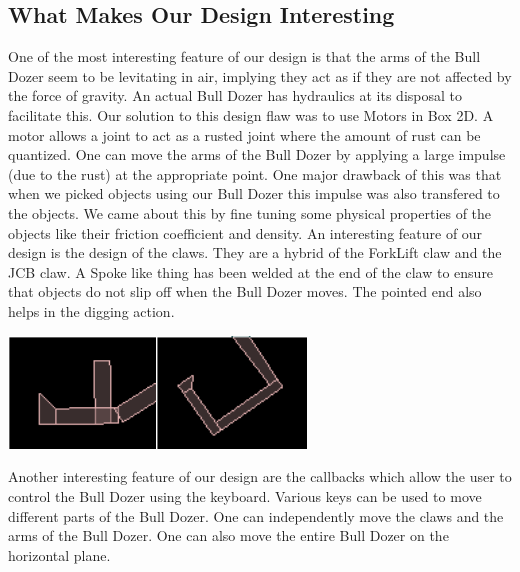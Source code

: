 \documentclass[11pt]{article}
\begin{document}
	\subsection{What Makes Our Design Interesting}
	One of the most interesting feature of our design is that the arms of the Bull Dozer seem to be levitating in air, implying they act as if they are not affected by the force of gravity. An actual Bull Dozer has hydraulics at its disposal to facilitate this.
 Our solution to this design flaw was to use Motors in Box 2D. A motor allows a joint to act as a rusted joint where the amount of rust can be quantized. One can move the arms of the Bull Dozer by applying a large impulse (due to the rust) at the appropriate point. One major drawback of this was that when we picked objects using our Bull Dozer this impulse was also transfered to the objects. We came about this by fine tuning some physical properties of the objects like their friction coefficient and density.\newline
	An interesting feature of our design is the design of the claws. They are a hybrid of the ForkLift claw and the JCB claw. A Spoke like thing has been welded at the end of the claw to ensure that objects do not slip off when the Bull Dozer moves. The pointed end also helps in the digging action.\newline
	\begin{center}\includegraphics[height=3cm]{Left_Claw1.png}\includegraphics[height=3cm]{Right_Claw.png}\end{center}	
	Another interesting feature of our design are the callbacks which allow the user to control the Bull Dozer using the keyboard.
Various keys can be used to move different parts of the Bull Dozer. One can independently move the claws and the arms of the Bull Dozer. One can also move the entire Bull Dozer on the horizontal plane.
\end{document}

